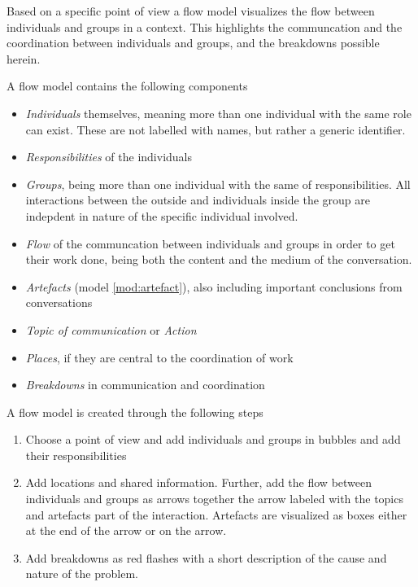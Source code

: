 \begin{model} \label{mod:flow_model} 
  Based on a specific point of view a flow model visualizes the flow between individuals and groups in a context. This highlights the communcation and the coordination between individuals and groups, and the breakdowns possible herein. \cite[p. 278]{benyon10}
  
  A flow model contains the following components \cite[p. 278-279]{benyon10}
  \begin{itemize}
  	\item \emph{Individuals} themselves, meaning more than one individual with the same role can exist. These are not labelled with names, but rather a generic identifier.
  	\item \emph{Responsibilities} of the individuals
  	\item \emph{Groups}, being more than one individual with the same of responsibilities. All interactions between the outside and individuals inside the group are indepdent in nature of the specific individual involved.
  	\item \emph{Flow} of the communcation between individuals and groups in order to get their work done, being both the content and the medium of the conversation.
  	\item \emph{Artefacts} (model \ref{mod:artefact}), also including important conclusions from conversations
  	\item \emph{Topic of communication} or \emph{Action}
  	\item \emph{Places}, if they are central to the coordination of work
  	\item \emph{Breakdowns} in communication and coordination
  \end{itemize}
  A flow model is created through the following steps \cite[p. 279-281]{benyon10}
  \begin{enumerate}
  	\item Choose a point of view and add individuals and groups in bubbles and add their responsibilities
  	\item Add locations and shared information. Further, add the flow between individuals and groups as arrows together the arrow labeled with the topics and artefacts part of the interaction. Artefacts are visualized as boxes either at the end of the arrow or on the arrow.
  	\item Add breakdowns as red flashes with a short description of the cause and nature of the problem.
  \end{enumerate}
\end{model}
